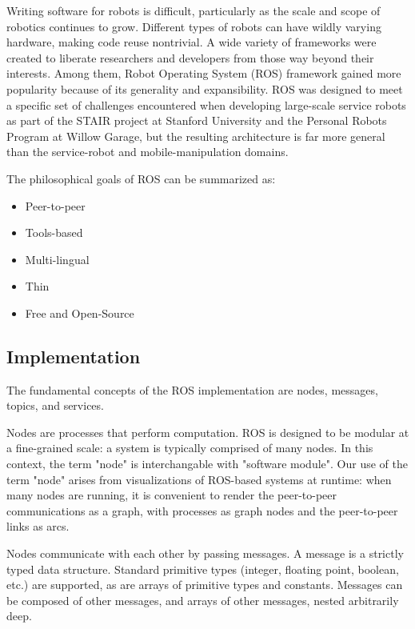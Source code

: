 Writing software for robots is difficult, particularly as the scale and scope of robotics continues to grow. Different types of robots can have wildly varying hardware, making code reuse nontrivial. A wide variety of frameworks were created to liberate researchers and developers from those way beyond their interests. Among them, Robot Operating System (ROS) framework \cite{ROS2009}  gained more popularity because of its generality and expansibility. ROS was designed to meet a specific set of challenges encountered when developing large-scale service robots as part of the STAIR project \cite{STAIR2007} at Stanford University and the Personal Robots Program \cite{PR2008} at Willow Garage, but the resulting architecture is far more general than the service-robot and mobile-manipulation domains.

The philosophical goals of ROS can be summarized as:

\begin{itemize}
\item Peer-to-peer 
\item Tools-based 
\item Multi-lingual 
\item Thin
\item Free and Open-Source
\end{itemize}

\subsection{Implementation}

The fundamental concepts of the ROS implementation are nodes, messages, topics, and services.

Nodes are processes that perform computation. ROS is designed to be modular at a fine-grained scale: a system is typically comprised of many nodes. In this context, the term "node" is interchangable with "software module". Our use of the term "node" arises from visualizations of ROS-based systems at runtime: when many nodes are running, it is convenient to render the peer-to-peer communications as a graph, with processes as graph nodes and the peer-to-peer links as arcs.

Nodes communicate with each other by passing messages. A message is a strictly typed data structure. Standard primitive types (integer, floating point, boolean, etc.) are supported, as are arrays of primitive types and constants. Messages can be composed of other messages, and arrays of other messages, nested arbitrarily deep.

